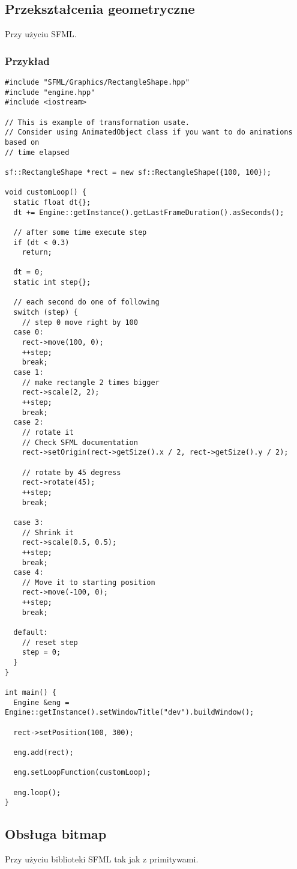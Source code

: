 \documentclass[11pt]{article}
\begin{document}
\subsection{Przekształcenia geometryczne}
\label{sec:org911a2e1}
Przy użyciu SFML.
\subsubsection{Przykład}
\label{sec:org6658196}

\begin{verbatim}
#include "SFML/Graphics/RectangleShape.hpp"
#include "engine.hpp"
#include <iostream>

// This is example of transformation usate.
// Consider using AnimatedObject class if you want to do animations based on
// time elapsed

sf::RectangleShape *rect = new sf::RectangleShape({100, 100});

void customLoop() {
  static float dt{};
  dt += Engine::getInstance().getLastFrameDuration().asSeconds();

  // after some time execute step
  if (dt < 0.3)
    return;

  dt = 0;
  static int step{};

  // each second do one of following
  switch (step) {
    // step 0 move right by 100
  case 0:
    rect->move(100, 0);
    ++step;
    break;
  case 1:
    // make rectangle 2 times bigger
    rect->scale(2, 2);
    ++step;
    break;
  case 2:
    // rotate it
    // Check SFML documentation
    rect->setOrigin(rect->getSize().x / 2, rect->getSize().y / 2);

    // rotate by 45 degress
    rect->rotate(45);
    ++step;
    break;

  case 3:
    // Shrink it
    rect->scale(0.5, 0.5);
    ++step;
    break;
  case 4:
    // Move it to starting position
    rect->move(-100, 0);
    ++step;
    break;

  default:
    // reset step
    step = 0;
  }
}

int main() {
  Engine &eng = Engine::getInstance().setWindowTitle("dev").buildWindow();

  rect->setPosition(100, 300);

  eng.add(rect);

  eng.setLoopFunction(customLoop);

  eng.loop();
}
\end{verbatim}
\subsection{Obsługa bitmap}
\label{sec:orgcdbd3b8}
Przy użyciu biblioteki SFML tak jak z primitywami.
\end{document}
